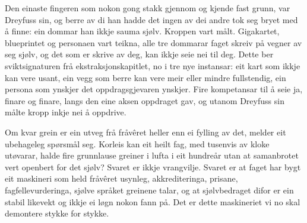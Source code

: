 Den einaste fingeren som nokon gong stakk gjennom og kjende fast grunn, var Dreyfuss sin, og berre av di han hadde det ingen av dei andre tok seg bryet med å finne: ein dommar han ikkje sauma sjølv. Kroppen vart målt. Gigakartet, blueprintet og personaen vart teikna, alle tre dommarar faget skreiv på vegner av seg sjølv, og det som er skrive av deg, kan ikkje seie nei til deg. Dette ber sviktsignaturen frå ekstraksjonskapitlet, no i tre nye instansar: eit kart som ikkje kan vere usant, ein vegg som berre kan vere meir eller mindre fullstendig, ein persona som ynskjer det oppdragsgjevaren ynskjer. Fire kompetansar til å seie ja, finare og finare, langs den eine aksen oppdraget gav, og utanom Dreyfuss sin målte kropp inkje nei å oppdrive.

\vignett

Om kvar grein er ein utveg frå fråvêret heller enn ei fylling av det, melder eit ubehageleg spørsmål seg. Korleis kan eit heilt fag, med tusenvis av kloke utøvarar, halde fire grunnlause greiner i lufta i eit hundreår utan at samanbrotet vert openbert for det sjølv? Svaret er ikkje vrangvilje. Svaret er at faget har bygt eit maskineri som held fråvêret usynleg, akkrediteringa, prisane, fagfellevurderinga, sjølve språket greinene talar, og at sjølvbedraget difor er ein stabil likevekt og ikkje ei løgn nokon fann på. Det er dette maskineriet vi no skal demontere stykke for stykke.



